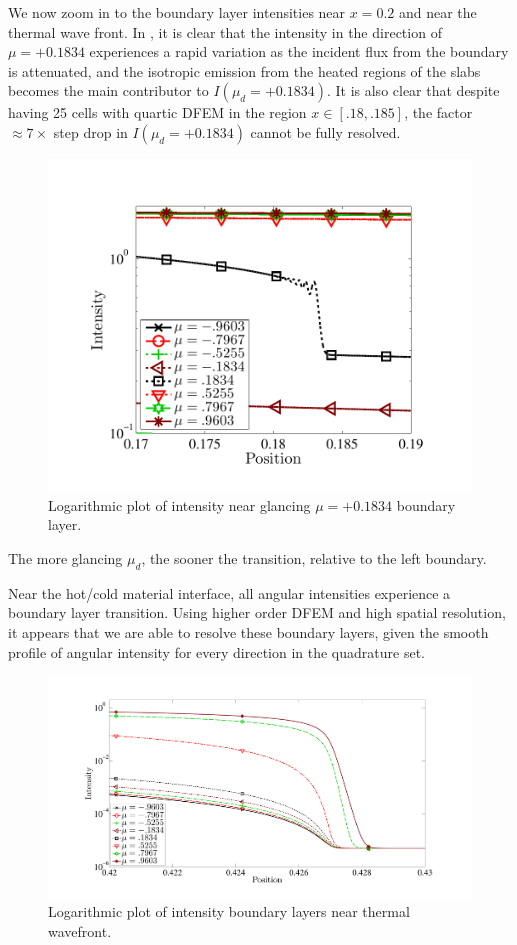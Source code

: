 We now zoom in to the boundary layer intensities near $x=0.2$ and near the thermal wave front.
In , it is clear that the intensity in the direction of $\mu=+0.1834$ experiences a rapid variation as the incident flux from the boundary is attenuated, and the isotropic emission from the heated regions of the slabs becomes the main contributor to $I(\mu_d = +0.1834)$.
It is also clear that despite having 25 cells with quartic DFEM in the region $x\in[.18,.185]$, the factor $\approx 7\times$ step drop in $I(\mu_d = +0.1834)$ cannot be fully resolved. 
\begin{figure}[!ht]
\centering
\includegraphics[width=12cm,trim=0.5in  0.2in 0.5in 0.5in,clip=true]{chapter6_grey_radtran/Dissertation_Data/S8_pos_mu_glance_boundary_layer_log.pdf}
\caption{Logarithmic plot of intensity near glancing $\mu=+0.1834$ boundary layer. }
\label{fig:s8_zoom_glance}
\end{figure}The more glancing $\mu_d$, the sooner the transition, relative to the left boundary.


Near the hot/cold material interface, all angular intensities experience a boundary layer transition.  
Using higher order DFEM and high spatial resolution, it appears that we are able to resolve these boundary layers, given the smooth profile of angular intensity for every direction in the quadrature set.
\begin{figure}[!ht]
\centering
\includegraphics[width=16cm,trim=1.5in  0.2in 0.5in 0.75in,clip=true]{chapter6_grey_radtran/Dissertation_Data/S8_thermal_wavefront_boundary_layer.pdf}
\caption{Logarithmic plot of intensity boundary layers near thermal wavefront.}
\label{fig:s8_zoom_thermal_wavefront}
\end{figure}

